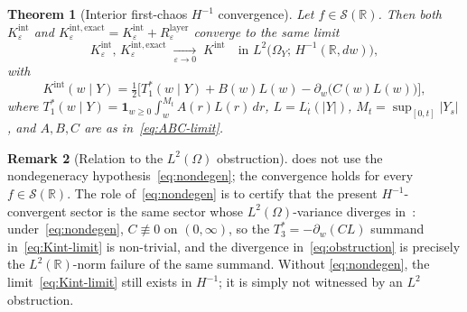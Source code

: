 \documentclass[11pt,reqno]{amsart}
\theoremstyle{plain}
\newtheorem{theorem}{Theorem}[section]
\theoremstyle{definition}
\newtheorem{remark}[theorem]{Remark}
\theoremstyle{remark}
\newcommand{\R}{\mathbb{R}}
\begin{document}
\begin{theorem}[Interior first-chaos
\texorpdfstring{$H^{-1}$}{H\textasciicircum-1} convergence]
\label{thm:interior}
Let $f\in\mathscr S(\R)$. Then both
$K_{\varepsilon}^{\mathrm{int}}$ and
$K_{\varepsilon}^{\mathrm{int,exact}}=K_{\varepsilon}^{\mathrm{int}}+R_{\varepsilon}^{\mathrm{layer}}$
converge to the same limit
\[
 K_{\varepsilon}^{\mathrm{int}},\,K_{\varepsilon}^{\mathrm{int,exact}}
 \;\xrightarrow[\varepsilon\to 0]{}\;K^{\mathrm{int}}
 \quad\text{in }L^{2}\bigl(\Omega_{Y};\,H^{-1}(\R,dw)\bigr),
\]
with
\begin{equation}\label{eq:Kint-limit}
 K^{\mathrm{int}}(w\mid Y)
 =\tfrac12\bigl[T_{1}^{*}(w\mid Y)+B(w)L(w)-\partial_{w}\bigl(C(w)L(w)\bigr)\bigr],
\end{equation}
where $T_{1}^{*}(w\mid Y)=\mathbf 1_{w\ge 0}\int_{w}^{M_{t}}A(r)L(r)\,dr$,
$L=L_{t}^{\cdot}(|Y|)$, $M_{t}=\sup_{[0,t]}|Y_{s}|$, and $A,B,C$ are
as in~\eqref{eq:ABC-limit}.
\end{theorem}

\begin{remark}[Relation to the
\texorpdfstring{$L^{2}(\Omega)$}{L\textasciicircum 2(Omega)} obstruction]
\label{rem:relation-to-obstruction}
 does not use the nondegeneracy
hypothesis~\eqref{eq:nondegen}; the convergence holds for every
$f\in\mathscr S(\R)$. The role of~\eqref{eq:nondegen} is to certify
that the present $H^{-1}$-convergent sector is the same sector
whose $L^{2}(\Omega)$-variance diverges in~\cite{Fontes-EnergyFirst}:
under~\eqref{eq:nondegen}, $C\not\equiv 0$ on $(0,\infty)$, so the
$T_{3}^{*}=-\partial_{w}(CL)$ summand in~\eqref{eq:Kint-limit} is
non-trivial, and the divergence in~\eqref{eq:obstruction} is
precisely the $L^{2}(\R)$-norm failure of the same summand. Without
\eqref{eq:nondegen}, the limit~\eqref{eq:Kint-limit} still exists in
$H^{-1}$; it is simply not witnessed by an $L^{2}$ obstruction.
\end{remark}
\end{document}
